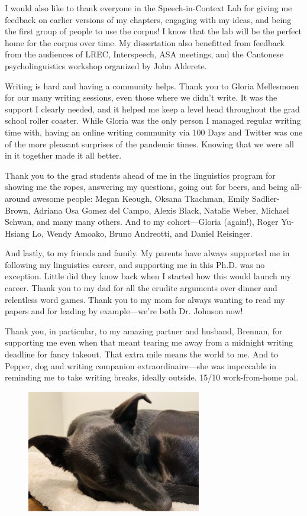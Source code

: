 I would also like to thank everyone in the Speech-in-Context Lab for giving me feedback on earlier versions of my chapters, engaging with my ideas, and being the first group of people to use the corpus! I know that the lab will be the perfect home for the corpus over time. My dissertation also benefitted from feedback from the audiences of LREC, Interspeech, ASA meetings, and the Cantonese psycholinguistics workshop organized by John Alderete.

Writing is hard and having a community helps. Thank you to Gloria Mellesmoen for our many writing sessions, even those where we didn't write. It was the support I clearly needed, and it helped me keep a level head throughout the grad school roller coaster. While Gloria was the only person I managed regular writing time with, having an online writing community via 100 Days and Twitter was one of the more pleasant surprises of the pandemic times. Knowing that we were all in it together made it all better.

Thank you to the grad students ahead of me in the linguistics program for showing me the ropes, answering my questions, going out for beers, and being all-around awesome people: Megan Keough, Oksana Tkachman, Emily Sadlier-Brown, Adriana Osa Gomez del Campo, Alexis Black, Natalie Weber, Michael Schwan, and many many others. And to my cohort---Gloria (again!), Roger Yu-Hsiang Lo, Wendy Amoako, Bruno Andreotti, and Daniel Reisinger. 

And lastly, to my friends and family. My parents have always supported me in following my linguistics career, and supporting me in this Ph.D. was no exception. Little did they know back when I started how this would launch my career. Thank you to my dad for all the erudite arguments over dinner and relentless word games. Thank you to my mom for always wanting to read my papers and for leading by example---we're both Dr. Johnson now! 

Thank you, in particular, to my amazing partner and husband, Brennan, for supporting me even when that meant tearing me away from a midnight writing deadline for fancy takeout. That extra mile means the world to me. And to Pepper, dog and writing companion extraordinaire---she was impeccable in reminding me to take writing breaks, ideally outside. 15/10 work-from-home pal. 
\bigskip

\begin{figure}[hb!]
    \begin{center}
    \includegraphics[width=3in]{figures/IMG_1228.png}     
    \end{center}
  \end{figure}


\endinput %
